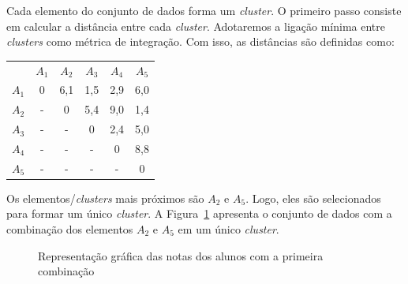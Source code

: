 Cada elemento do conjunto de dados forma um \textit{cluster}. O primeiro passo consiste em calcular a distância entre cada \textit{cluster}. Adotaremos a ligação mínima entre \textit{clusters} como métrica de integração. Com isso, as distâncias são definidas como:

\insertspace

\begin{center}
	\begin{tabular}{cccccc}
		      & $A_1$ & $A_2$ & $A_3$ & $A_4$ & $A_5$ \\
		$A_1$ &   0   &  6,1  &  1,5  &  2,9  &  6,0  \\
		$A_2$ &   -   &   0   &  5,4  &  9,0  &  1,4  \\
		$A_3$ &   -   &   -   &   0   &  2,4  &  5,0  \\
		$A_4$ &   -   &   -   &   -   &   0   &  8,8  \\
		$A_5$ &   -   &   -   &   -   &   -   &   0
	\end{tabular}
\end{center}

\insertspace

Os elementos/\textit{clusters} mais próximos são $A_2$ e $A_5$. Logo, eles são selecionados para formar um único \textit{cluster}. A Figura~\ref{fig:dados-notas-alunos-particao} apresenta o conjunto de dados com a combinação dos elementos $A_2$ e $A_5$ em um único \textit{cluster}.

\begin{figure}[h]
	\centering
	
	
	\caption{Representação gráfica das notas dos alunos com a primeira combinação}
	\label{fig:dados-notas-alunos-particao}
\end{figure}

